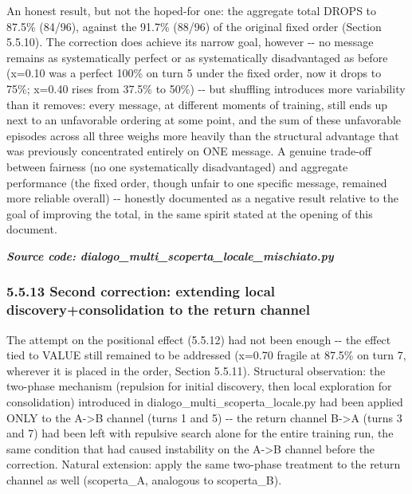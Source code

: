 \documentclass[
  english,
]{article}
\begin{document}
An honest result, but not the hoped-for one: the aggregate total DROPS to 87.5\% (84/96), against the 91.7\% (88/96) of the original fixed order (Section 5.5.10). The correction does achieve its narrow goal, however -\/- no message remains as systematically perfect or as systematically disadvantaged as before (x=0.10 was a perfect 100\% on turn 5 under the fixed order, now it drops to 75\%; x=0.40 rises from 37.5\% to 50\%) -\/- but shuffling introduces more variability than it removes: every message, at different moments of training, still ends up next to an unfavorable ordering at some point, and the sum of these unfavorable episodes across all three weighs more heavily than the structural advantage that was previously concentrated entirely on ONE message. A genuine trade-off between fairness (no one systematically disadvantaged) and aggregate performance (the fixed order, though unfair to one specific message, remained more reliable overall) -\/- honestly documented as a negative result relative to the goal of improving the total, in the same spirit stated at the opening of this document.

\textit{\textbf{Source code: dialogo\_\allowbreak{}multi\_\allowbreak{}scoperta\_\allowbreak{}locale\_\allowbreak{}mischiato.py}}


\subsubsection{5.5.13 Second correction: extending local discovery+consolidation to the return channel}\label{second-correction-extending-local-discoveryconsolidation-to-the-return-channel}

The attempt on the positional effect (5.5.12) had not been enough -\/- the effect tied to VALUE still remained to be addressed (x=0.70 fragile at 87.5\% on turn 7, wherever it is placed in the order, Section 5.5.11). Structural observation: the two-phase mechanism (repulsion for initial discovery, then local exploration for consolidation) introduced in dialogo\_\allowbreak{}multi\_\allowbreak{}scoperta\_\allowbreak{}locale.py had been applied ONLY to the A-\textgreater B channel (turns 1 and 5) -\/- the return channel B-\textgreater A (turns 3 and 7) had been left with repulsive search alone for the entire training run, the same condition that had caused instability on the A-\textgreater B channel before the correction. Natural extension: apply the same two-phase treatment to the return channel as well (scoperta\_\allowbreak{}A, analogous to scoperta\_\allowbreak{}B).
\end{document}
